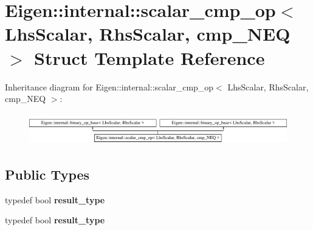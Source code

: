 \hypertarget{struct_eigen_1_1internal_1_1scalar__cmp__op_3_01_lhs_scalar_00_01_rhs_scalar_00_01cmp___n_e_q_01_4}{}\section{Eigen\+:\+:internal\+:\+:scalar\+\_\+cmp\+\_\+op$<$ Lhs\+Scalar, Rhs\+Scalar, cmp\+\_\+\+N\+EQ $>$ Struct Template Reference}
\label{struct_eigen_1_1internal_1_1scalar__cmp__op_3_01_lhs_scalar_00_01_rhs_scalar_00_01cmp___n_e_q_01_4}
Inheritance diagram for Eigen\+:\+:internal\+:\+:scalar\+\_\+cmp\+\_\+op$<$ Lhs\+Scalar, Rhs\+Scalar, cmp\+\_\+\+N\+EQ $>$\+:\begin{figure}[H]
\begin{center}
\leavevmode
\includegraphics[height=1.379310cm]{struct_eigen_1_1internal_1_1scalar__cmp__op_3_01_lhs_scalar_00_01_rhs_scalar_00_01cmp___n_e_q_01_4}
\end{center}
\end{figure}
\subsection*{Public Types}
\begin{DoxyCompactItemize}
\item 
\mbox{\label{struct_eigen_1_1internal_1_1scalar__cmp__op_3_01_lhs_scalar_00_01_rhs_scalar_00_01cmp___n_e_q_01_4_a20f97343b99b932c85879630b79ac599}} 
typedef bool {\bfseries result\+\_\+type}
\item 
\mbox{\label{struct_eigen_1_1internal_1_1scalar__cmp__op_3_01_lhs_scalar_00_01_rhs_scalar_00_01cmp___n_e_q_01_4_a20f97343b99b932c85879630b79ac599}} 
typedef bool {\bfseries result\+\_\+type}
\end{DoxyCompactItemize}
